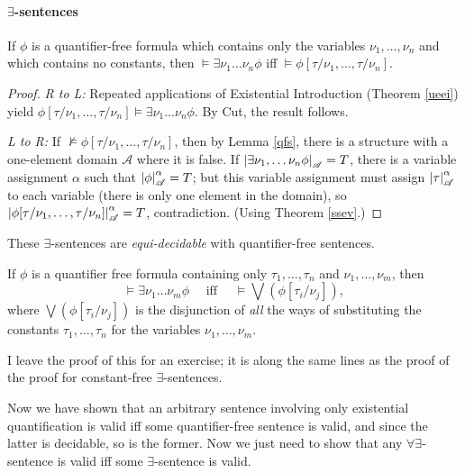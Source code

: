 \paragraph{$\exists$-sentences}

\begin{theorem}
	If $\phi$ is a quantifier-free formula which contains only the variables $\nu_{1},\ldots, \nu_{n}$ and which contains no constants, then $\vDash \exists \nu_{1}\ldots\nu_{n} \phi$ iff $\vDash \phi[\tau/\nu_{1},\ldots,\tau/\nu_{n}]$. \begin{proof}
		{\emph{R to L:} Repeated applications of Existential Introduction (Theorem \ref{ueei}) yield $\phi[\tau/\nu_{1},\ldots,\tau/\nu_{n}] \vDash \exists \nu_{1}\ldots\nu_{n} \phi$. By Cut, the result follows.
		
		 \emph{L to R:} If $\not\vDash \phi[\tau/\nu_{1},\ldots,\tau/\nu_{n}]$, then by Lemma \ref{qfs}, there is a structure with a  one-element domain $\mathscr{A}$ where it is false.  If $\left|\exists \nu_{1},\ldots\nu_{n} \phi\right|_{\mathscr{A}}=T$, there is a variable assignment $\alpha$ such that $\left|\phi\right|^{\alpha}_{\mathscr{A}}=T$; but this variable assignment must assign $\left|\tau\right|^{\alpha}_{\mathscr{A}}$ to each variable (there is only one element in the domain), so $\left|\phi[\tau/\nu_{1},\ldots,\tau/\nu_{n}]\right|^{\alpha}_{\mathscr{A}}=T$, contradiction. (Using Theorem \ref{ssev}.)}
	\end{proof}
\end{theorem}
These $\exists$-sentences are \emph{equi-decidable} with quantifier-free sentences.

\begin{theorem}
	If $\phi$ is a quantifier free formula containing only $\tau_{1},\ldots,\tau_{n}$ and $\nu_{1},\ldots,\nu_{m}$, then $$\vDash\exists \nu_{1}\ldots\nu_{m}\phi \quad\text{ iff }\quad \vDash \bigvee (\phi[\tau_{i}/\nu_{j}]),$$ where $\bigvee (\phi[\tau_{i}/\nu_{j}])$ is the disjunction of \emph{all} the ways of substituting the constants $\tau_{1},\ldots,\tau_{n}$ for the variables $\nu_{1},\ldots,\nu_{m}$.
\end{theorem}

I leave the proof of this for an exercise; it is along the same lines as the proof of the proof for constant-free $\exists$-sentences.

Now we have shown that an arbitrary sentence involving only existential quantification is valid iff some quantifier-free sentence is valid, and since the latter is decidable, so is the former. Now we just need to show that any $\forall\exists$-sentence is valid iff some $\exists$-sentence is valid.


